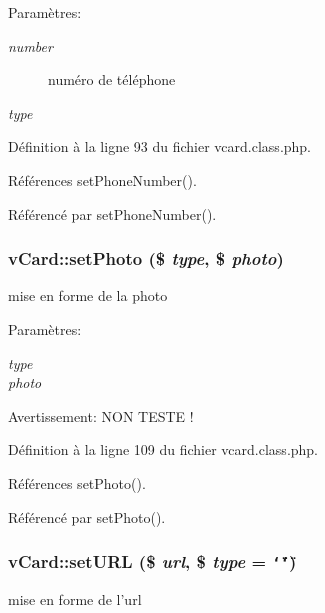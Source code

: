 \begin{Desc}
\item[Param\`{e}tres:]
\begin{description}
\item[{\em number}]num\'{e}ro de t\'{e}l\'{e}phone \item[{\em type}]\end{description}
\end{Desc}


D\'{e}finition \`{a} la ligne 93 du fichier vcard.class.php.

R\'{e}f\'{e}rences set\-Phone\-Number().

R\'{e}f\'{e}renc\'{e} par set\-Phone\-Number().\hypertarget{classvCard_a1}{
\subsubsection[setPhoto]{\setlength{\rightskip}{0pt plus 5cm}v\-Card::set\-Photo (\$ {\em type}, \$ {\em photo})}}
\label{classvCard_a1}


mise en forme de la photo 

\begin{Desc}
\item[Param\`{e}tres:]
\begin{description}
\item[{\em type}]\item[{\em photo}]\end{description}
\end{Desc}
\begin{Desc}
\item[Avertissement:]NON TESTE ! \end{Desc}


D\'{e}finition \`{a} la ligne 109 du fichier vcard.class.php.

R\'{e}f\'{e}rences set\-Photo().

R\'{e}f\'{e}renc\'{e} par set\-Photo().\hypertarget{classvCard_a9}{
\subsubsection[setURL]{\setlength{\rightskip}{0pt plus 5cm}v\-Card::set\-URL (\$ {\em url}, \$ {\em type} = {\tt \char`\"{}\char`\"{}})}}
\label{classvCard_a9}


mise en forme de l'url 

